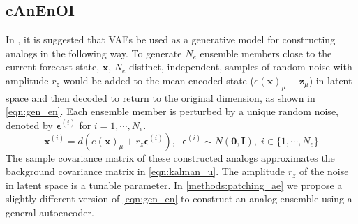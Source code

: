 \documentclass[final,3p]{elsarticle}
\theoremstyle{break}
\newcommand{\eps}{\epsilon}
\newcommand{\bb}[1]{\mathbf{#1}}
\begin{document}
\subsection{cAnEnOI}\label{methods:cAnEnOI}


In \cite{grooms2020analog}, it is suggested that VAEs be used as a generative model for constructing analogs in the following way.
To generate $N_e$ ensemble members close to the current forecast state, $\bb{x}$, $N_e$ distinct, independent, samples of random noise with amplitude $r_z$ would be added to the mean encoded state ($e(\bb{x})_{\mu}\equiv\bb{z}_{\mu}$) in latent space and then decoded to return to the original dimension, as shown in \cref{eqn:gen_en}.
Each ensemble member is perturbed by a unique random noise, denoted by $\bb{\eps}^{(i)}$ for $i=1,\cdots,N_e$.
\begin{equation}
\bb{x}^{(i)} = d\left(e(\bb{x})_{\mu}+r_z\bb{\eps}^{(i)}\right),\;\; \bb{\eps}^{(i)}\sim N(\bb{0},\bb{I}),\; i\in\{1,\cdots,N_e\}
\label{eqn:gen_en}
\end{equation}
The sample covariance matrix of these constructed analogs approximates the background covariance matrix in \cref{eqn:kalman_u}.
The amplitude $r_z$ of the noise in latent space is a tunable parameter.
In \cref{methods:patching_ae} we propose a slightly different version of \cref{eqn:gen_en} to construct an analog ensemble using a general autoencoder.
\end{document}
